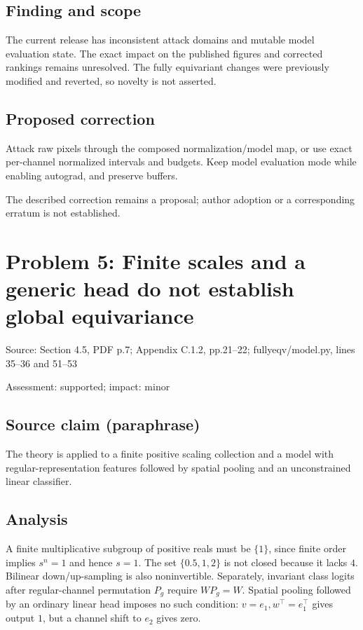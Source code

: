 \documentclass[11pt]{article}
\begin{document}
\subsection*{Finding and scope}

The current release has inconsistent attack domains and mutable model evaluation state. The exact impact on the published figures and corrected rankings remains unresolved. The fully equivariant changes were previously modified and reverted, so novelty is not asserted.

\subsection*{Proposed correction}

Attack raw pixels through the composed normalization/model map, or use exact per-channel normalized intervals and budgets. Keep model evaluation mode while enabling autograd, and preserve buffers.

The described correction remains a proposal; author adoption or a corresponding erratum is not established.

\section*{Problem 5: Finite scales and a generic head do not establish global equivariance}

Source: Section 4.5, PDF p.7; Appendix C.1.2, pp.21–22; fullyeqv/model.py, lines 35–36 and 51–53

Assessment: supported; impact: minor

\subsection*{Source claim (paraphrase)}

The theory is applied to a finite positive scaling collection and a model with regular-representation features followed by spatial pooling and an unconstrained linear classifier.

\subsection*{Analysis}

A finite multiplicative subgroup of positive reals must be \(\{1\}\), since finite order implies \(s^n=1\) and hence \(s=1\). The set \(\{0.5,1,2\}\) is not closed because it lacks \(4\). Bilinear down/up-sampling is also noninvertible. Separately, invariant class logits after regular-channel permutation \(P_g\) require \(WP_g=W\). Spatial pooling followed by an ordinary linear head imposes no such condition: \(v=e_1,w^\top=e_1^\top\) gives output \(1\), but a channel shift to \(e_2\) gives zero.
\end{document}
